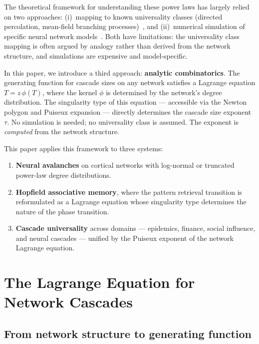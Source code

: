\documentclass[11pt,a4paper]{article}
\theoremstyle{definition}
\begin{document}
The theoretical framework for understanding these power laws has
largely relied on two approaches: (i)~mapping to known universality
classes (directed percolation, mean-field branching
processes)~\cite{munoz2018}, and (ii)~numerical simulation of specific
neural network models~\cite{levina2007}. Both have limitations: the
universality class mapping is often argued by analogy rather than
derived from the network structure, and simulations are expensive and
model-specific.

In this paper, we introduce a third approach: \textbf{analytic
combinatorics}. The generating function for cascade sizes on any
network satisfies a Lagrange equation $T = z\,\phi(T)$, where the
kernel $\phi$ is determined by the network's degree distribution.
The singularity type of this equation --- accessible via the Newton
polygon and Puiseux expansion --- directly determines the cascade
size exponent $\tau$. No simulation is needed; no universality class
is assumed. The exponent is \emph{computed} from the network
structure.

This paper applies this framework to three systems:

\begin{enumerate}[leftmargin=2em]
\item \textbf{Neural avalanches} on cortical networks with log-normal
or truncated power-law degree distributions.

\item \textbf{Hopfield associative memory}, where the pattern retrieval
transition is reformulated as a Lagrange equation whose singularity
type determines the nature of the phase transition.

\item \textbf{Cascade universality} across domains --- epidemics, finance,
social influence, and neural cascades --- unified by the Puiseux
exponent of the network Lagrange equation.
\end{enumerate}


\section{The Lagrange Equation for Network Cascades}
\label{sec:lagrange}

\subsection{From network structure to generating function}
\end{document}
